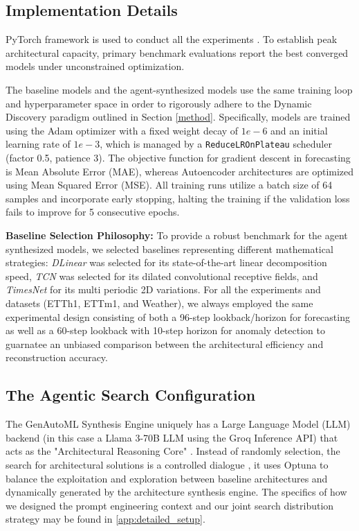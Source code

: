 \documentclass{article}
\begin{document}
\subsection{Implementation Details}
 PyTorch framework is used to conduct all the experiments \cite{paszke2019pytorch}. To establish peak architectural capacity, primary benchmark evaluations report the best converged models under unconstrained optimization. 

The baseline models and the agent-synthesized models use the same training loop and hyperparameter space in order to rigorously adhere to the Dynamic Discovery paradigm outlined in Section \ref{method}. Specifically, models are trained using the Adam optimizer with a fixed weight decay of $1e-6$ and an initial learning rate of $1e-3$, which is managed by a \texttt{ReduceLROnPlateau} scheduler (factor 0.5, patience 3). The objective function for gradient descent in forecasting is Mean Absolute Error (MAE), whereas Autoencoder architectures are optimized using Mean Squared Error (MSE). All training runs utilize a batch size of 64 samples and incorporate early stopping, halting the training if the validation loss fails to improve for 5 consecutive epochs.

\textbf{Baseline Selection Philosophy:} To provide a robust benchmark for the agent synthesized models, we selected baselines representing different mathematical strategies: \textit{DLinear} was selected for its state-of-the-art linear decomposition speed, \textit{TCN} was  selected for its dilated convolutional receptive fields, and \textit{TimesNet} for its multi periodic 2D variations. For all the experiments and datasets (ETTh1, ETTm1, and Weather), we always employed the same experimental design consisting of both a 96-step lookback/horizon for forecasting as well as a 60-step lookback with 10-step horizon for anomaly detection to guarnatee an unbiased comparison between the architectural efficiency and reconstruction accuracy.

\subsection{The Agentic Search Configuration}
The GenAutoML Synthesis Engine uniquely has a Large Language Model (LLM) backend (in this case a Llama 3-70B LLM using the Groq Inference API) that acts as the "Architectural Reasoning Core" \cite{grattafiori2024llama}. Instead of randomly selection, the search for architectural solutions is a controlled dialogue , it uses Optuna \cite{akiba2019optuna} to balance the exploitation and exploration between baseline architectures and dynamically generated by the architecture synthesis engine. The specifics of how we designed the prompt engineering context and our joint search distribution strategy may be found in \ref{app:detailed_setup}.
\end{document}
